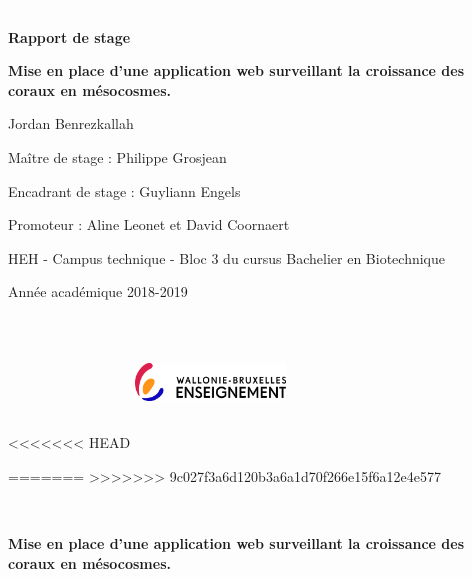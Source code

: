 \documentclass[]{report}
\begin{document}
\begin{centering}
\begin{figure}
\end{figure}

\textcolor{white}{.}

\vspace{2.5 cm}

\Huge

{\bf Rapport de stage}

\vspace{1 cm}

\huge 
{\bf Mise en place d'une application web surveillant la croissance des coraux en mésocosmes.}

\vspace{1 cm}

\Large

Jordan Benrezkallah

\vspace{2 cm}

\normalsize
Maître de stage : Philippe Grosjean

Encadrant de stage : Guyliann Engels

Promoteur : Aline Leonet et David Coornaert


\vspace{3.5 cm}

\normalsize
HEH - Campus technique -
Bloc 3 du cursus Bachelier en Biotechnique

Année académique 2018-2019

\end {centering}

<<<<<<< HEAD
\includegraphics[width=4cm,height=3.5cm]{../image/fede.jpg}

=======
>>>>>>> 9c027f3a6d120b3a6a1d70f266e15f6a12e4e577
\newpage

\null
\newpage

\begin{centering}



\textcolor{white}{.}





\vfill

\huge 
{\bf Mise en place d'une application web surveillant la croissance des coraux en mésocosmes.}

\vfill


\end {centering}
\end{document}
